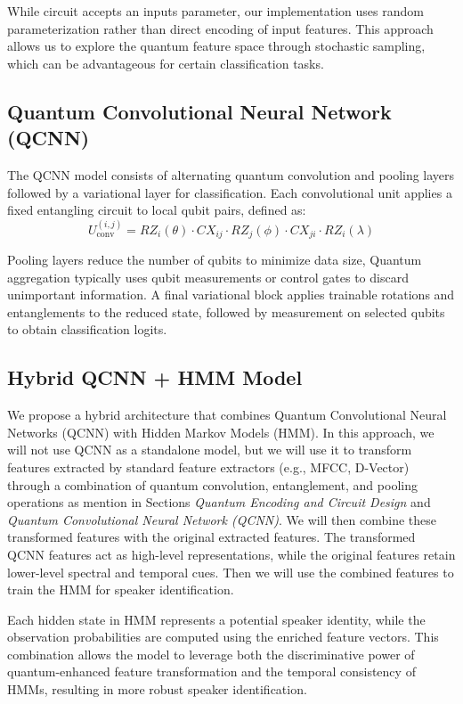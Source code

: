 \documentclass[conference]{IEEEtran}
\begin{document}
While circuit accepts an inputs parameter, our implementation uses random parameterization rather than direct encoding of input features. This approach allows us to explore the quantum feature space through stochastic sampling, which can be advantageous for certain classification tasks.

\subsection{Quantum Convolutional Neural Network (QCNN)}

The QCNN model consists of alternating quantum convolution and pooling layers followed by a variational layer for classification. Each convolutional unit applies a fixed entangling circuit to local qubit pairs, defined as:
\[
    U^{(i,j)}_{\text{conv}} = RZ_i(\theta) \cdot CX_{ij} \cdot RZ_j(\phi) \cdot CX_{ji} \cdot RZ_i(\lambda)
\]

Pooling layers reduce the number of qubits to minimize data size, Quantum aggregation typically uses qubit measurements or control gates to discard unimportant information. A final variational block applies trainable rotations and entanglements to the reduced state, followed by measurement on selected qubits to obtain classification logits.

\subsection{Hybrid QCNN + HMM Model}

We propose a hybrid architecture that combines Quantum Convolutional Neural Networks (QCNN) with Hidden Markov Models (HMM). In this approach, we will not use QCNN as a standalone model, but we will use it to transform features extracted by standard feature extractors (e.g., MFCC, D-Vector) through a combination of quantum convolution, entanglement, and pooling operations as mention in Sections \textit{Quantum Encoding and Circuit Design} and \textit{Quantum Convolutional Neural Network (QCNN)}. We will then combine these transformed features with the original extracted features. The transformed QCNN features act as high-level representations, while the original features retain lower-level spectral and temporal cues. Then we will use the combined features to train the HMM for speaker identification.

Each hidden state in HMM represents a potential speaker identity, while the observation probabilities are computed using the enriched feature vectors. This combination allows the model to leverage both the discriminative power of quantum-enhanced feature transformation and the temporal consistency of HMMs, resulting in more robust speaker identification.
\end{document}
